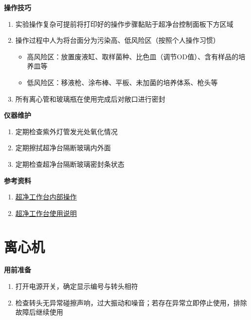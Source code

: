 \documentclass[
]{book}
\providecommand{\tightlist}{%
  \setlength{\itemsep}{0pt}\setlength{\parskip}{0pt}}
\begin{document}
\textbf{操作技巧}

\begin{enumerate}
\def\labelenumi{\arabic{enumi}.}
\tightlist
\item
  实验操作复杂可提前将打印好的操作步骤黏贴于超净台控制面板下方区域
\item
  操作过程中人为将台面分为污染高、低风险区（按照个人操作习惯）

  \begin{itemize}
  \tightlist
  \item
    高风险区：放置废液缸、取样菌种、比色皿（调节OD值）、含有样品的培养皿等
  \item
    低风险区：移液枪、涂布棒、平板、未加菌的培养体系、枪头等
  \end{itemize}
\item
  所有离心管和玻璃瓶在使用完成后对敞口进行密封
\end{enumerate}

\textbf{仪器维护}

\begin{enumerate}
\def\labelenumi{\arabic{enumi}.}
\tightlist
\item
  定期检查紫外灯管发光处氧化情况
\item
  定期擦拭超净台隔断玻璃内外面
\item
  定期检查超净台隔断玻璃密封条状态
\end{enumerate}

\textbf{参考资料}

\begin{enumerate}
\def\labelenumi{\arabic{enumi}.}
\tightlist
\item
  \href{https://www.bilibili.com/video/BV1H64y1S7JC}{超净工作台内部操作}
\item
  \href{https://www.bilibili.com/video/BV1L44y1r7wf}{超净工作台使用说明}
\end{enumerate}

\hypertarget{ux79bbux5fc3ux673a}{%
\section{离心机}\label{ux79bbux5fc3ux673a}}

\textbf{用前准备}

\begin{enumerate}
\def\labelenumi{\arabic{enumi}.}
\tightlist
\item
  打开电源开关，确定显示编号与转头相符
\item
  检查转头无异常碰擦声响，过大振动和噪音；若存在异常立即停止使用，排除故障后继续使用
\end{enumerate}
\end{document}
